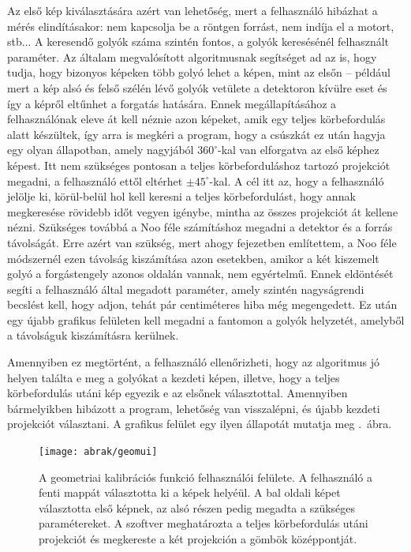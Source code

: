 \documentclass[a4paper,12pt]{article}
\begin{document}
Az első kép kiválasztására azért van lehetőség, mert a felhasználó hibázhat a mérés elindításakor: nem kapcsolja be a röntgen forrást, nem indíja el a motort, stb... A keresendő golyók száma szintén fontos, a golyók keresésénél felhasznált paraméter. Az általam megvalósított algoritmusnak segítséget ad az is, hogy tudja, hogy bizonyos képeken több golyó lehet a képen, mint az elsőn -- például mert a kép alsó és felső szélén lévő golyók vetülete a detektoron kívülre eset és így a képről eltűnhet a forgatás hatására. Ennek megállapításához a felhasználónak eleve át kell néznie azon képeket, amik egy teljes körbefordulás alatt készültek, így arra is megkéri a program, hogy a csúszkát ez után hagyja egy olyan állapotban, amely nagyjából  $360^\circ$-kal van elforgatva az első képhez képest. Itt nem szükséges pontosan a teljes körbeforduláshoz tartozó projekciót megadni, a felhasználó ettől eltérhet $\pm 45^\circ$-kal. A cél itt az, hogy a felhasználó jelölje ki, körül-belül hol kell keresni a teljes körbefordulást, hogy annak megkeresése rövidebb időt vegyen igénybe, mintha az összes projekciót át kellene nézni. Szükséges továbbá a Noo féle számításhoz megadni a detektor és a forrás távolságát. Erre azért van szükség, mert ahogy  fejezetben említettem, a Noo féle módszernél ezen távolság kiszámítása azon esetekben, amikor a két kiszemelt golyó a forgástengely azonos oldalán vannak, nem egyértelmű. Ennek eldöntését segíti a felhasználó által megadott paraméter, amely szintén nagyságrendi becslést kell, hogy adjon, tehát pár centiméteres hiba még megengedett. Ez után egy újabb grafikus felületen kell megadni a fantomon a golyók helyzetét, amelyből a távolságuk kiszámításra kerülnek.


Amennyiben ez megtörtént, a felhasználó ellenőrizheti, hogy az algoritmus jó helyen találta e meg a golyókat a kezdeti képen, illetve, hogy a teljes körbefordulás utáni kép egyezik e az elsőnek választottal. Amennyiben bármelyikben hibázott a program, lehetőség van visszalépni, és újabb kezdeti projekciót választani. A grafikus felület egy ilyen állapotát mutatja meg  .~ábra. 


\begin{figure}[htbp]
\center
\texttt{[image: abrak/geomui]}
\caption{A geometriai kalibrációs funkció felhasználói felülete. A felhasználó a fenti mappát választotta ki a képek helyéül. A bal oldali képet választotta első képnek, az alsó részen pedig megadta a szükséges paramétereket. A szoftver meghatározta a teljes körbefordulás utáni projekciót és megkereste a két projekción a gömbök középpontját. }
\label{fig:geomui}
\end{figure}
\end{document}

